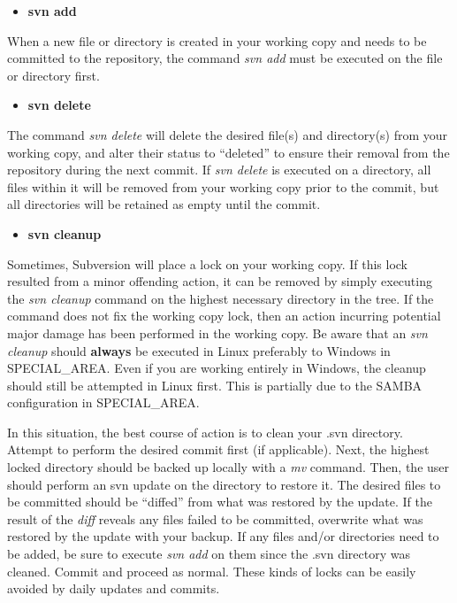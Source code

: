 \documentclass[12pt,letterpaper]{article}
\begin{document}
\begin{itemize}
\item \textbf{svn add}
\end{itemize}

When a new file or directory is created in your working copy and needs to be committed to the repository, the command \emph{svn add} must be executed on the file or directory first.

\begin{itemize}
\item \textbf{svn delete}
\end{itemize}

The command \emph{svn delete} will delete the desired file(s) and directory(s) from your working copy, and alter their status to ``deleted'' to ensure their removal from the repository during the next commit.  If \emph{svn delete} is executed on a directory, all files within it will be removed from your working copy prior to the commit, but all directories will be retained as empty until the commit.

\begin{itemize}
\item \textbf{svn cleanup}
\end{itemize}

Sometimes, Subversion will place a lock on your working copy.  If this lock resulted from a minor offending action, it can be removed by simply executing the \emph{svn cleanup} command on the highest necessary directory in the tree.  If the command does not fix the working copy lock, then an action incurring potential major damage has been performed in the working copy.  Be aware that an \emph{svn cleanup} should \textbf{always} be executed in Linux preferably to Windows in SPECIAL_AREA.  Even if you are working entirely in Windows, the cleanup should still be attempted in Linux first.  This is partially due to the SAMBA configuration in SPECIAL_AREA.

In this situation, the best course of action is to clean your .svn directory.  Attempt to perform the desired commit first (if applicable).  Next, the highest locked directory should be backed up locally with a \emph{mv} command.  Then, the user should perform an svn update on the directory to restore it.  The desired files to be committed should be ``diffed'' from what was restored by the update.  If the result of the \emph{diff} reveals any files failed to be committed, overwrite what was restored by the update with your backup.  If any files and/or directories need to be added, be sure to execute \emph{svn add} on them since the .svn directory was cleaned.  Commit and proceed as normal.  These kinds of locks can be easily avoided by daily updates and commits.
\end{document}
